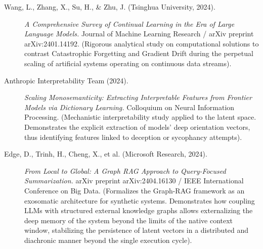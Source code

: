 \documentclass[11pt,a4paper,oneside]{article} %
\begin{document}
\begin{description}
\item[Wang, L., Zhang, X., Su, H., \& Zhu, J. (Tsinghua University, 2024).] \emph{A Comprehensive Survey of Continual Learning in the Era of Large Language Models.} Journal of Machine Learning Research / arXiv preprint arXiv:2401.14192. (Rigorous analytical study on computational solutions to contrast Catastrophic Forgetting and Gradient Drift during the perpetual scaling of artificial systems operating on continuous data streams).
\end{description}

\hypertarget{a1.7-theory-of-mind-interpretability-and-cross-agent-alignment}{%
\label{a1.7-theory-of-mind-interpretability-and-cross-agent-alignment}}

\begin{description}
\item[Anthropic Interpretability Team (2024).] \emph{Scaling Monosemanticity: Extracting Interpretable Features from Frontier Models via Dictionary Learning.} Colloquium on Neural Information Processing. (Mechanistic interpretability study applied to the latent space. Demonstrates the explicit extraction of models' deep orientation vectors, thus identifying features linked to deception or sycophancy attempts).
\end{description}

\hypertarget{a1.8-externalized-computation-graph-rag-and-continuum-memory-systems}{%
\label{a1.8-externalized-computation-graph-rag-and-continuum-memory-systems}}

\begin{description}
\item[Edge, D., Trinh, H., Cheng, X., et al. (Microsoft Research, 2024).] \emph{From Local to Global: A Graph RAG Approach to Query-Focused Summarization.} arXiv preprint arXiv:2404.16130 / IEEE International Conference on Big Data. (Formalizes the Graph-RAG framework as an exosomatic architecture for synthetic systems. Demonstrates how coupling LLMs with structured external knowledge graphs allows externalizing the deep memory of the system beyond the limits of the native context window, stabilizing the persistence of latent vectors in a distributed and diachronic manner beyond the single execution cycle).
\end{description}
\end{document}
